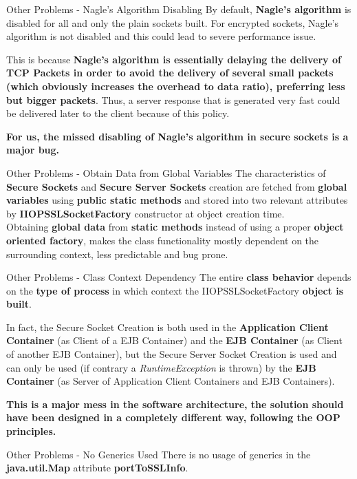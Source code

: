 \documentclass{../common/latex_classes/pdf_presentation}
\begin{document}
	\begin{frame}{Other Problems - Nagle's Algorithm Disabling}
		By default, \textbf{Nagle's algorithm} is disabled for all and only the plain sockets built. For encrypted sockets, Nagle's algorithm is not disabled and this could lead to severe performance issue. \par This is because \textbf{Nagle's algorithm is essentially delaying the delivery of TCP Packets in order to avoid the delivery of several small packets (which obviously increases the overhead to data ratio), preferring less but bigger packets}. Thus, a server response that is generated very fast could be delivered later to the client because of this policy. \par \textbf{For us, the missed disabling of Nagle's algorithm in secure sockets is a major bug.}
	\end{frame}

	\begin{frame}{Other Problems - Obtain Data from Global Variables}
		The characteristics of \textbf{Secure Sockets} and \textbf{Secure Server Sockets} creation are fetched from \textbf{global variables} using \textbf{public static methods} and stored into two relevant attributes by \textbf{IIOPSSLSocketFactory} constructor at object creation time.\\
		Obtaining \textbf{global data} from \textbf{static methods} instead of using a proper \textbf{object oriented factory}, makes the class functionality mostly dependent on the surrounding context, less predictable and bug prone.
	\end{frame}
	
	\begin{frame}{Other Problems - Class Context Dependency}
		The entire \textbf{class behavior} depends on the \textbf{type of process} in which context the IIOPSSLSocketFactory \textbf{object is built}. \par In fact, the Secure Socket Creation is both used in the \textbf{Application Client Container} (as Client of a EJB Container) and the \textbf{EJB Container} (as Client of another EJB Container), but the Secure Server Socket Creation is used and can only be used (if contrary a \textit{RuntimeException} is thrown) by the \textbf{EJB Container} (as Server of Application Client Containers and EJB Containers). \par \textbf{This is a major mess in the software architecture, the solution should have been designed in a completely different way, following the OOP principles.}
	\end{frame}
	
	\begin{frame}{Other Problems - No Generics Used}
		There is no usage of generics in the \textbf{java.util.Map} attribute \textbf{portToSSLInfo}.%
	\end{frame}
\end{document}
